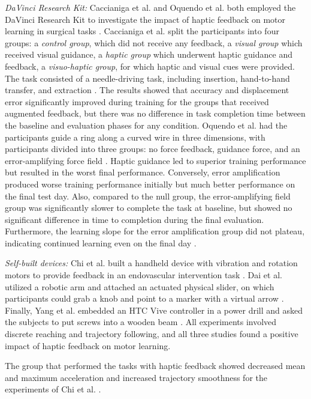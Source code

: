 \textit{DaVinci Research Kit:} Caccianiga et al. and Oquendo et al. both employed the DaVinci Research Kit to investigate the impact of haptic feedback on motor learning in surgical tasks \cite{Caccianiga2021, Oquendo2024}. Caccianiga et al. split the participants into four groups: a \textit{control group}, which did not receive any feedback, a \textit{visual group} which received visual guidance, a \textit{haptic group} which underwent haptic guidance and feedback, a \textit{visuo-haptic group}, for which haptic and visual cues were provided. The task consisted of a needle-driving task, including insertion, hand-to-hand transfer, and extraction \cite{Caccianiga2021}. The results showed that accuracy and displacement error significantly improved during training for the groups that received augmented feedback, but there was no difference in task completion time between the baseline and evaluation phases for any condition. Oquendo et al. had the participants guide a ring along a curved wire in three dimensions, with participants divided into three groups: no force feedback, guidance force, and an error-amplifying force field \cite{Oquendo2024}. Haptic guidance led to superior training performance but resulted in the worst final performance. Conversely, error amplification produced worse training performance initially but much better performance on the final test day. Also, compared to the null group, the error-amplifying field group was significantly slower to complete the task at baseline, but showed no significant difference in time to completion during the final evaluation. Furthermore, the learning slope for the error amplification group did not plateau, indicating continued learning even on the final day \cite{Oquendo2024}.

\textit{Self-built devices:} Chi et al. built a handheld device with vibration and rotation motors to provide feedback in an endovascular intervention task \cite{Chi2017}. Dai et al. utilized a robotic arm and attached an actuated physical slider, on which participants could grab a knob and point to a marker with a virtual arrow \cite{Dai2023}. Finally, Yang et al. embedded an HTC Vive controller in a power drill and asked the subjects to put screws into a wooden beam \cite{Yang2023}. All experiments involved discrete reaching and trajectory following, and all three studies found a positive impact of haptic feedback on motor learning. 

The group that performed the tasks with haptic feedback showed decreased mean and maximum acceleration and increased trajectory smoothness for the experiments of Chi et al. \cite{Chi2017}. 

